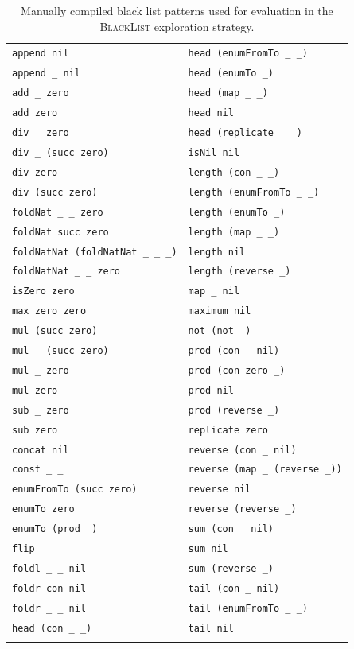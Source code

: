 \begin{longtable}{l l}
\lstinline?append nil? & \lstinline?head (enumFromTo _ _)?\\
\lstinline?append _ nil? & \lstinline?head (enumTo _)?\\
\lstinline?add _ zero? & \lstinline?head (map _ _)?\\
\lstinline?add zero? & \lstinline?head nil?\\
\lstinline?div _ zero? & \lstinline?head (replicate _ _)?\\
\lstinline?div _ (succ zero)? & \lstinline?isNil nil?\\
\lstinline?div zero? & \lstinline?length (con _ _)?\\
\lstinline?div (succ zero)? & \lstinline?length (enumFromTo _ _)?\\
\lstinline?foldNat _ _ zero? & \lstinline?length (enumTo _)?\\
\lstinline?foldNat succ zero? & \lstinline?length (map _ _)?\\
\lstinline?foldNatNat (foldNatNat _ _ _)? & \lstinline?length nil?\\
\lstinline?foldNatNat _ _ zero? & \lstinline?length (reverse _)?\\
\lstinline?isZero zero? & \lstinline?map _ nil?\\
\lstinline?max zero zero? & \lstinline?maximum nil?\\
\lstinline?mul (succ zero)? & \lstinline?not (not _)?\\
\lstinline?mul _ (succ zero)? & \lstinline?prod (con _ nil)?\\
\lstinline?mul _ zero? & \lstinline?prod (con zero _)?\\
\lstinline?mul zero? & \lstinline?prod nil?\\
\lstinline?sub _ zero? & \lstinline?prod (reverse _)?\\
\lstinline?sub zero? & \lstinline?replicate zero?\\
\lstinline?concat nil? & \lstinline?reverse (con _ nil)?\\
\lstinline?const _ _? & \lstinline?reverse (map _ (reverse _))?\\
\lstinline?enumFromTo (succ zero)? & \lstinline?reverse nil?\\
\lstinline?enumTo zero? & \lstinline?reverse (reverse _)?\\
\lstinline?enumTo (prod _)? & \lstinline?sum (con _ nil)?\\
\lstinline?flip _ _ _? & \lstinline?sum nil?\\
\lstinline?foldl _ _ nil? & \lstinline?sum (reverse _)?\\
\lstinline?foldr con nil? & \lstinline?tail (con _ nil)?\\
\lstinline?foldr _ _ nil? & \lstinline?tail (enumFromTo _ _)?\\
\lstinline?head (con _ _)? & \lstinline?tail nil?\\
\caption{Manually compiled black list patterns used for evaluation in the \textsc{BlackList} exploration strategy.\label{fig:manual_blacklist}}
\end{longtable}

